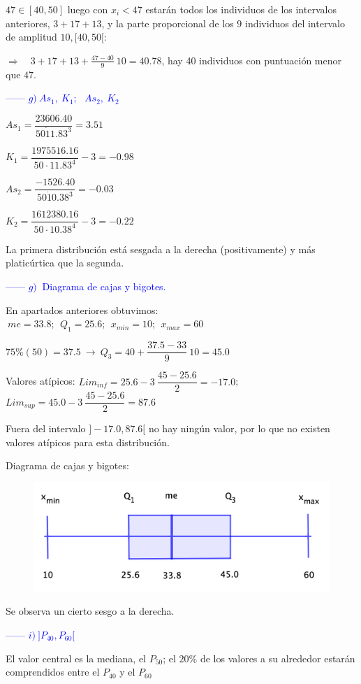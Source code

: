 $47 \in [40,50]$ luego con $x_i<47$ estarán todos los individuos de los intervalos anteriores, $3+17+13$, y la parte proporcional de los $9$ individuos del intervalo de amplitud $10, [40,50[$:

$\Rightarrow \quad 3+17+13+ \frac{47-40}{9} \ 10 =40.78$, hay 40 individuos con puntuación menor que $47$. 
 
\textcolor{blue}{------ $g) \ As_1,\ K_1;\ \ \ As_2,\ K_2$}

\begin{multicols}{2}
$As_1=\dfrac{23606.40}{50\dot 11.83^3}=3.51$

$K_1=\dfrac{1975516.16}{50\cdot 11.83^4}-3=-0.98$

$As_2=\dfrac{-1526.40}{50\dot 10.38^3}=-0.03$

$K_2=\dfrac{1612380.16}{50\cdot 10.38^4}-3=-0.22$
\end{multicols}

La primera distribución está sesgada a la derecha (positivamente) y más platicúrtica que la segunda.


\textcolor{blue}{------ $g) \ $  Diagrama de cajas y bigotes.}

En apartados anteriores obtuvimos: $\ me=33.8;\ \ Q_1=25.6;\ \ x_{min}=10;\ \ x_{max}=60$

$75\% (50)=37.5 \ \to \ Q_3=40+\dfrac{37.5-33}{9}\ 10=45.0$

Valores atípicos: $Lim_{inf}=25.6-3\ \dfrac{45-25.6}{2}=-17.0$; $Lim_{sup}=45.0-3\ \dfrac{45-25.6}{2}=87.6$

Fuera del intervalo $]-17.0,87.6[$ no hay ningún valor, por lo que no existen valores atípicos para esta distribución.

Diagrama de cajas y bigotes:

\begin{figure}[H]
			\centering
			\includegraphics[width=.5\textwidth]{imagenes/imagenes01/T01IM39.png}
	\end{figure}

Se observa un cierto sesgo a la derecha.

\textcolor{blue}{------ $i)\ ]P_{40},P_{60}[$}

El valor central es la mediana, el $P_{50}$; el $20\%$ de los valores a su alrededor estarán comprendidos entre el $P_{40}$ y el $P_{60}$

